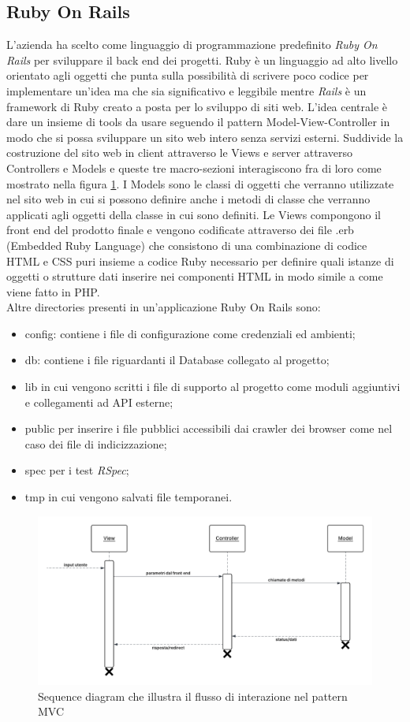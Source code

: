 \documentclass[target=bach,aauheader=,style=]{thud}
\begin{document}
\subsection{Ruby On Rails}
L'azienda ha scelto come linguaggio di programmazione predefinito \textit{Ruby On Rails} \cite{ruby_on_rails} per sviluppare il back end dei progetti.
Ruby è un linguaggio ad alto livello orientato agli oggetti che punta sulla possibilità di scrivere poco codice per implementare un'idea ma che sia significativo
e leggibile mentre \textit{Rails} è un framework di Ruby creato a posta per lo sviluppo di siti web.
L'idea centrale è dare un insieme di tools da usare seguendo il pattern Model-View-Controller in modo che si possa sviluppare un sito web intero senza servizi esterni.
Suddivide la costruzione del sito web in client attraverso le Views e server attraverso Controllers e Models e queste tre macro-sezioni interagiscono
fra di loro come mostrato nella figura \ref{fig:mvc-sequence}.
I Models sono le classi di oggetti che verranno utilizzate nel sito web in cui si possono definire anche i metodi di classe che verranno applicati agli oggetti
della classe in cui sono definiti. Le Views compongono il front end del prodotto finale e vengono codificate attraverso dei file .erb (Embedded Ruby Language)
che consistono di una combinazione di codice HTML e CSS puri insieme a codice Ruby necessario per definire quali istanze di oggetti o strutture dati inserire
nei componenti HTML in modo simile a come viene fatto in PHP.\\
Altre directories presenti in un'applicazione Ruby On Rails sono:
\begin{itemize}
    \item config: contiene i file di configurazione come credenziali ed ambienti;
    \item db: contiene i file riguardanti il Database collegato al progetto;
    \item lib in cui vengono scritti i file di supporto al progetto come moduli aggiuntivi e collegamenti ad API esterne;
    \item public per inserire i file pubblici accessibili dai crawler dei browser come nel caso dei file di indicizzazione;
    \item spec per i test \textit{RSpec};
    \item tmp in cui vengono salvati file temporanei.
\end{itemize}
\begin{figure}[h]
\centering
\includegraphics[width=0.8\linewidth]{Sequence Diagram pattern MVC.png}
\caption{Sequence diagram che illustra il flusso di interazione nel pattern MVC}
\label{fig:mvc-sequence}
\end{figure}
\end{document}
